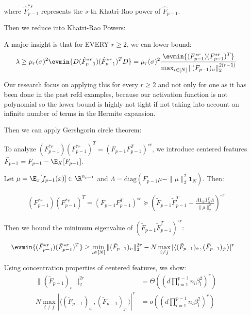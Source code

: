 where $\hat{F}_{p-1}^{*s}$ represents the $s$-th Khatri-Rao power of $\hat{F}_{p-1}$.

Then we reduce into Khatri-Rao Powers:

\begin{tcolorbox}[colback=green!10,colframe=green!60!black,title={\textbf{Insight : Khatri-Rao Powers and Hermite Expansion}},enhanced,drop shadow]
A major insight is that for EVERY $r \geq 2$, we can lower bound:
\begin{align}
\lambda \geq \mu_r(\sigma)^2 \evmin{D(\hat{F}_{p-1}^{*r})(\hat{F}_{p-1}^{*r})^T D} = \mu_r(\sigma)^2 \frac{\evmin{(F_{p-1}^{*r})(F_{p-1}^{*r})^T}}{\max_{i \in [N]} \|(F_{p-1})_{i:}\|_2^{2(r-1)}}
\end{align}

Our research focus on applying this for every $r \geq 2$ and not only for one as it has been done in the past refd examples, because our activation function is not polynomial so the lower bound is highly not tight if not taking into account an infinite number of terms in the Hermite expansion.
\end{tcolorbox}


Then we can apply Gershgorin circle theorem:

To analyze $(F_{p-1}^{*r})(F_{p-1}^{*r})^T = (F_{p-1}F_{p-1}^T)^{\circ r}$, we introduce centered features $\tilde{F}_{p-1} = F_{p-1} - \E_X[F_{p-1}]$. 

Let $\mu = \E_x[f_{p-1}(x)] \in \R^{n_{p-1}}$ and $\Lambda = \text{diag}(F_{p-1}\mu - \|\mu\|_2^2 \mathbf{1}_N)$. Then:

\begin{align}
(F_{p-1}^{*r})(F_{p-1}^{*r})^T = (F_{p-1}F_{p-1}^T)^{\circ r} \succeq \left(\tilde{F}_{p-1}\tilde{F}_{p-1}^T - \frac{\Lambda \mathbf{1}_N \mathbf{1}_N^T \Lambda}{\|\mu\|_2^2}\right)^{\circ r}
\end{align}

Then we bound the minimum eigenvalue of $(\tilde{F}_{p-1}\tilde{F}_{p-1}^T)^{\circ r}$:

\begin{align}
\evmin{(\tilde{F}_{p-1}^{*r})(\tilde{F}_{p-1}^{*r})^T} &\geq \min_{i \in [N]} \|(\tilde{F}_{p-1})_{i:}\|_2^{2r} - N \max_{i \neq j} |\langle (\tilde{F}_{p-1})_{i:}, (\tilde{F}_{p-1})_{j:} \rangle|^r
\end{align}

Using concentration properties of centered features, we show:
\begin{align}
\|(\tilde{F}_{p-1})_{i:}\|_2^{2r} &= \Theta\left(\left(d \prod_{l=1}^{p-1} n_l \beta_l^2\right)^r\right) \\
N \max_{i \neq j} |\langle (\tilde{F}_{p-1})_{i:}, (\tilde{F}_{p-1})_{j:} \rangle|^r &= o\left(\left(d \prod_{l=1}^{p-1} n_l \beta_l^2\right)^r\right)
\end{align}


